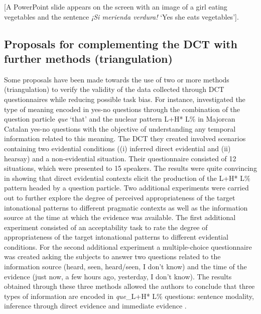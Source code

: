 \documentclass[output=paper]{LSP/langsci}
\begin{document}
[A PowerPoint slide appears on the screen with an image of a girl eating vegetables and the sentence \textit{¡Si merienda verdura!} ‘Yes she eats vegetables’]. 
    \z


\subsection{Proposals for complementing the DCT with further methods (triangulation)}
\label{sec:van:3.3}
Some proposals have been made towards the use of two or more methods (triangulation) to verify the validity of the data collected through DCT questionnaires while reducing possible task bias. For instance, \citet{Vanrell2014evidentiality} investigated the type of meaning encoded in yes-no questions through the combination of the question particle \textit{que} ‘that’ and the nuclear pattern L+H* L\% in Majorcan Catalan yes-no questions with the objective of understanding any temporal information related to this meaning. The DCT they created involved scenarios containing two evidential conditions ((i) inferred direct evidential and (ii) hearsay) and a non-evidential situation. Their questionnaire consisted of 12 situations, which were presented to 15 speakers. The results were quite convincing in showing that direct evidential contexts elicit the production of the L+H* L\% pattern headed by a question particle. Two additional experiments were carried out to further explore the degree of perceived appropriateness of the target intonational patterns to different pragmatic contexts as well as the information source at the time at which the evidence was available. The first additional experiment consisted of an acceptability task to rate the degree of appropriateness of the target intonational patterns to different evidential conditions. For the second additional experiment a multiple-choice questionnaire was created asking the subjects to answer two questions related to the information source (heard, seen, heard/seen, I don’t know) and the time of the evidence (just now, a few hours ago, yesterday, I don’t know). The results obtained through these three methods allowed the authors to conclude that three types of information are encoded in \textit{que}\_L+H* L\% questions: sentence modality, inference through direct evidence and immediate evidence \citep[1025]{Vanrell2014evidentiality}.
\end{document}
